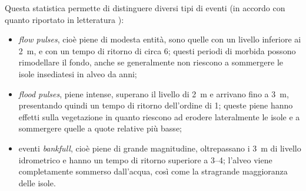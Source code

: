 Questa statistica permette di distinguere diversi tipi di eventi (in accordo con quanto riportato in letteratura ):
%
\begin{itemize}
	\item \emph{flow pulses}, cioè piene di modesta entità, sono quelle con un livello inferiore ai \SI{2}{\m}, e con un tempo di ritorno di circa \SI{6}{\mesi}; questi periodi di morbida possono rimodellare il fondo, anche se generalmente non riescono a sommergere le isole insediatesi in alveo da anni;
	\item \emph{flood pulses}, piene intense, superano il livello di \SI{2}{\m} e arrivano fino a \SI{3}{\m}, presentando quindi un tempo di ritorno dell'ordine di \SI{1}{\anno}; queste piene hanno effetti sulla vegetazione in quanto riescono ad erodere lateralmente le isole e a sommergere quelle a quote relative più basse;
	\item eventi \emph{bankfull}, cioè piene di grande magnitudine, oltrepassano i \SI{3}{\m} di livello idrometrico e hanno un tempo di ritorno superiore a \SIrange[range-phrase={-}]{3}{4}{\anni}; l'alveo viene completamente sommerso dall'acqua, così come la stragrande maggioranza delle isole.
\end{itemize}
%


